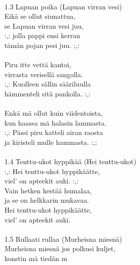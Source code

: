 \hspace{10mm} \\ 1.3 Lapuan poika (Lapuan virran vesi) \\ Eikä se ollut siunattua, \\ se Lapuan virran vesi juu, \\ :,: jolla pappi ensi kerran  \\ tämän pojan pesi juu. :,:  \\ \hspace{10mm} \\ Piru itte vettä kantoi, \\ virrasta verisellä sangolla. \\ :,: Kuolleen sällin sääriluulla \\ hämmenteli sitä pankolla. :,:  \\ \hspace{10mm} \\ Enkä mä ollut kuin viidentoista, \\ kun haassa mä halasin lammasta. \\ :,: Pässi piru katteli airan raosta \\ ja kiristeli mulle hammasta. :,:  \\ \hspace{10mm} \\ 1.4 Tenttu-ukot hyppikää (Hei tenttu-ukot) \\ :,: Hei tenttu-ukot hyppikäätte, \\ viel' on apteekit auki. :,: \\ Vain hetken kestää humalaa, \\ ja se on helkkarin mukavaa. \\ Hei tenttu-ukot hyppikäätte, \\ viel' on apteekit auki. \\ \hspace{10mm} \\ 1.5 Rullaati rullaa (Murheisna miesnä) \\ Murheisna miesnä jos polkusi kuljet, \\ konstin mä tiedän m